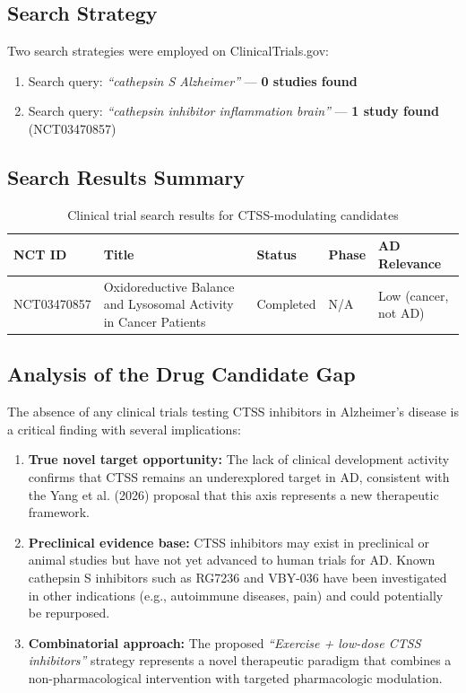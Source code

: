 \documentclass[11pt, a4paper]{article}
\begin{document}
\subsection{Search Strategy}

Two search strategies were employed on ClinicalTrials.gov:
\begin{enumerate}
    \item Search query: \textit{``cathepsin S Alzheimer''} — \textbf{0 studies found}
    \item Search query: \textit{``cathepsin inhibitor inflammation brain''} — \textbf{1 study found} (NCT03470857)
\end{enumerate}

\subsection{Search Results Summary}

\begin{table}[h]
\centering
\begin{tabular}{lp{6cm}lll}
\toprule
\textbf{NCT ID} & \textbf{Title} & \textbf{Status} & \textbf{Phase} & \textbf{AD Relevance} \\
\midrule
NCT03470857 & Oxidoreductive Balance and Lysosomal Activity in Cancer Patients & Completed & N/A & Low (cancer, not AD) \\
\bottomrule
\end{tabular}
\caption{Clinical trial search results for CTSS-modulating candidates}
\end{table}

\subsection{Analysis of the Drug Candidate Gap}

The absence of any clinical trials testing CTSS inhibitors in Alzheimer's disease is a critical finding with several implications:

\begin{enumerate}
    \item \textbf{True novel target opportunity:} The lack of clinical development activity confirms that CTSS remains an underexplored target in AD, consistent with the Yang et al. (2026) proposal that this axis represents a new therapeutic framework.
    \item \textbf{Preclinical evidence base:} CTSS inhibitors may exist in preclinical or animal studies but have not yet advanced to human trials for AD. Known cathepsin S inhibitors such as RG7236 and VBY-036 have been investigated in other indications (e.g., autoimmune diseases, pain) and could potentially be repurposed.
    \item \textbf{Combinatorial approach:} The proposed \textit{``Exercise + low-dose CTSS inhibitors''} strategy represents a novel therapeutic paradigm that combines a non-pharmacological intervention with targeted pharmacologic modulation.
\end{enumerate}
\end{document}
